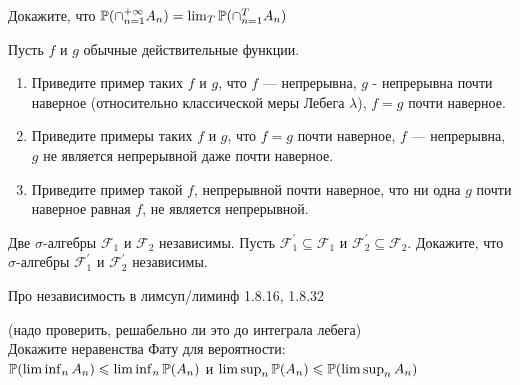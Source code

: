 \begin{problem}
Докажите, что
$\P(\cap_{n=1}^{+\infty}A_{n})=\lim_{T}\P(\cap_{n=1}^{T}A_{n})$

\begin{sol}

\end{sol}
\end{problem}

\begin{problem}
Пусть $f$ и $g$ обычные действительные функции.
\begin{enumerate}
\item Приведите пример таких $f$ и $g$, что $f$ — непрерывна, $g$ -
непрерывна почти наверное (относительно
классической меры Лебега $\lambda$), $f=g$ почти наверное.
\item Приведите примеры таких $f$ и $g$, что $f=g$ почти наверное,
$f$ — непрерывна, $g$ не является непрерывной даже почти наверное.
\item Приведите пример такой $f$, непрерывной почти наверное, что ни
одна $g$ почти наверное равная $f$, не является непрерывной.
\end{enumerate}

\begin{sol}

\end{sol}
\end{problem}

\begin{problem}
Две $\sigma$-алгебры $\mathcal{F}_{1}$ и $\mathcal{F}_{2}$
независимы. Пусть $\mathcal{F}_{1}^{'}\subseteq \mathcal{F}_{1}$ и
$\mathcal{F}_{2}^{'}\subseteq \mathcal{F}_{2}$. Докажите, что
$\sigma$-алгебры $\mathcal{F}_{1}^{'}$ и $\mathcal{F}_{2}^{'}$
независимы.

\begin{sol}

\end{sol}
\end{problem}

\begin{problem}
Про независимость в лимсуп/лиминф 1.8.16, 1.8.32

\begin{sol}

\end{sol}
\end{problem}

\begin{problem}
 (надо проверить, решабельно ли это до интеграла лебега) \\
Докажите неравенства Фату для вероятности: \\
$\P(\liminf_{n}A_{n})\le \liminf_{n}\P(A_{n})$ и
$\limsup_{n}\P(A_{n})\le \P(\limsup_{n}A_{n})$

\begin{sol}

\end{sol}
\end{problem}

